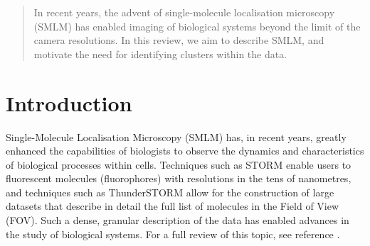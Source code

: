 \documentclass[11pt]{article}
\author{Sean Baccas}
\begin{document}
	
	
	
		
			
			
			
			
	\begin{abstract}
		
		In recent years, the advent of single-molecule localisation microscopy (SMLM) \cite{Lelek2021} has enabled imaging of biological systems beyond the limit of the camera resolutions. In this review, we aim to describe SMLM, and motivate the need for identifying clusters within the data. 
		
	\end{abstract}	
	
	\tableofcontents
	

\newpage
\section{Introduction}
Single-Molecule Localisation Microscopy (SMLM) has, in recent years, greatly enhanced the capabilities of biologists to observe the dynamics and characteristics of biological processes within cells. Techniques such as STORM \cite{rust2006sub} enable users to fluorescent molecules (fluorophores) with resolutions in the tens of nanometres, and techniques such as ThunderSTORM \cite{thunderstorm} allow for the construction of large datasets that describe in detail the full list of molecules in the Field of View (FOV). Such a dense, granular description of the data has enabled advances in the study of biological systems. For a full review of this topic, see reference \cite{Lelek2021}.\\
\end{document}

